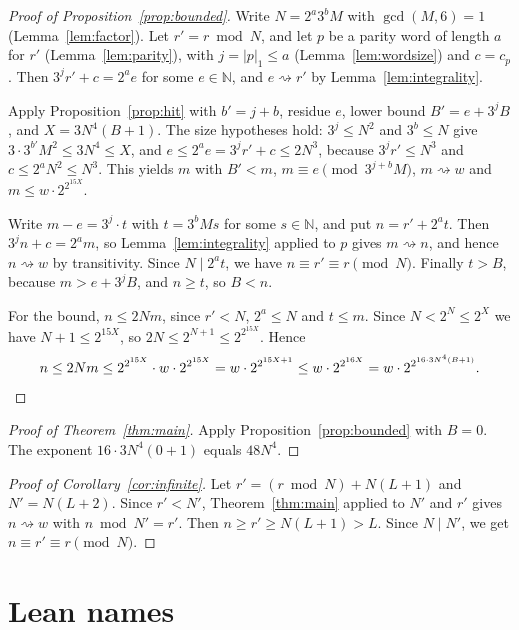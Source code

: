\documentclass[11pt,reqno,oneside]{amsart}
\theoremstyle{plain}
\theoremstyle{definition}
\numberwithin{equation}{section}
\begin{document}
\begin{proof}[Proof of Proposition~\ref{prop:bounded}]
Write $N=2^a3^bM$ with $\gcd(M,6)=1$ (Lemma~\ref{lem:factor}). Let $r'=r\bmod N$, and let $p$ be a parity word of length $a$ for $r'$ (Lemma~\ref{lem:parity}), with $j=|p|_1\le a$ (Lemma~\ref{lem:wordsize}) and $c=c_p$. Then $3^jr'+c=2^a e$ for some $e\in\mathbb N$, and $e\rightsquigarrow r'$ by Lemma~\ref{lem:integrality}.

Apply Proposition~\ref{prop:hit} with $b'=j+b$, residue $e$, lower bound $B'=e+3^jB$, and $X=3N^4(B+1)$. The size hypotheses hold: $3^j\le N^2$ and $3^b\le N$ give $3\cdot3^{b'}M^2\le3N^4\le X$, and $e\le2^ae=3^jr'+c\le2N^3$, because $3^jr'\le N^3$ and $c\le2^aN^2\le N^3$. This yields $m$ with $B'<m$, $m\equiv e\pmod{3^{j+b}M}$, $m\rightsquigarrow w$ and $m\le w\cdot2^{2^{15X}}$.

Write $m-e=3^j\cdot t$ with $t=3^bMs$ for some $s\in\mathbb N$, and put $n=r'+2^a t$. Then $3^jn+c=2^a m$, so Lemma~\ref{lem:integrality} applied to $p$ gives $m\rightsquigarrow n$, and hence $n\rightsquigarrow w$ by transitivity. Since $N\mid 2^a t$, we have $n\equiv r'\equiv r\pmod N$. Finally $t>B$, because $m>e+3^jB$, and $n\ge t$, so $B<n$.

For the bound, $n\le2Nm$, since $r'<N$, $2^a\le N$ and $t\le m$. Since $N<2^N\le2^X$ we have $N+1\le2^{15X}$, so $2N\le2^{N+1}\le2^{2^{15X}}$. Hence
\[
n\le 2Nm\le 2^{2^{15X}}\cdot w\cdot 2^{2^{15X}}=w\cdot2^{2^{15X+1}}\le w\cdot2^{2^{16X}}=w\cdot2^{2^{16\cdot3N^4(B+1)}}.\qedhere
\]
\end{proof}

\begin{proof}[Proof of Theorem~\ref{thm:main}]
Apply Proposition~\ref{prop:bounded} with $B=0$. The exponent $16\cdot3N^4(0+1)$ equals $48N^4$.
\end{proof}

\begin{proof}[Proof of Corollary~\ref{cor:infinite}]
Let $r'=(r\bmod N)+N(L+1)$ and $N'=N(L+2)$. Since $r'<N'$, Theorem~\ref{thm:main} applied to $N'$ and $r'$ gives $n\rightsquigarrow w$ with $n\bmod N'=r'$. Then $n\ge r'\ge N(L+1)>L$. Since $N\mid N'$, we get $n\equiv r'\equiv r\pmod N$.
\end{proof}

\clearpage
\appendix
\section{Lean names}\label{app:names}
\end{document}

